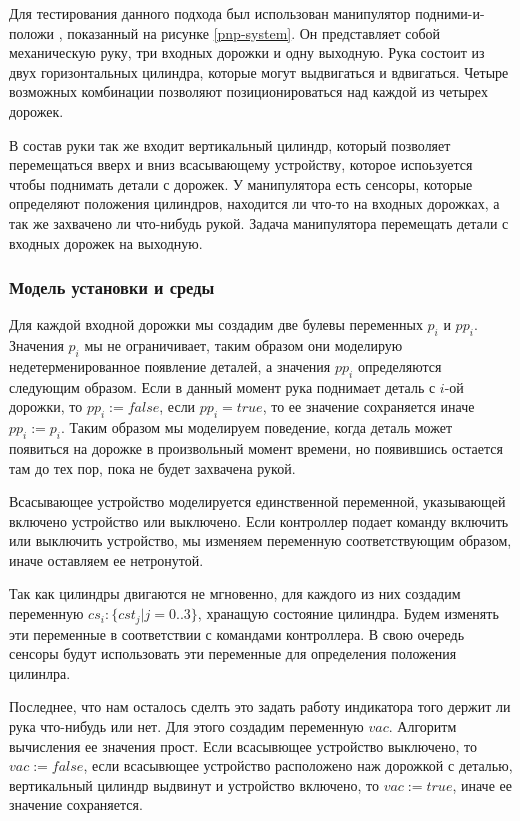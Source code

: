\documentclass[14pt]{extarticle}
\theoremstyle{plain}
\theoremstyle{definition}
\begin{document}
Для тестирования данного подхода был использован манипулятор подними-и-положи \cite{pnp},
показанный на рисунке \ref{pnp-system}.
Он представляет собой механическую руку, три входных дорожки и одну выходную.
Рука состоит из двух горизонтальных цилиндра, которые могут выдвигаться и
вдвигаться. Четыре возможных комбинации позволяют позиционироваться над
каждой из четырех дорожек. 

В состав руки так же входит вертикальный цилиндр, который позволяет
перемещаться вверх и вниз всасывающему устройству, которое испоьзуется чтобы
поднимать детали с дорожек. У манипулятора есть сенсоры, которые определяют
положения цилиндров, находится ли что-то на входных дорожках, а так же
захвачено ли что-нибудь рукой. Задача манипулятора перемещать детали с входных
дорожек на выходную.

\subsubsection{Модель установки и среды}

Для каждой входной дорожки мы создадим две булевы переменных $p_i$ и $pp_i$.
Значения $p_i$ мы не ограничивает, таким образом они моделирую
недетерменированное появление деталей, а значения $pp_i$ определяются
следующим образом. Если в данный момент рука поднимает деталь с $i$-ой
дорожки, то $pp_i := false$, если $pp_i = true$, то ее значение сохраняется
иначе $pp_i := p_i$. Таким образом мы моделируем поведение, когда деталь
может появиться на дорожке в произвольный момент времени, но появившись
остается там до тех пор, пока не будет захвачена рукой.

Всасывающее устройство моделируется единственной переменной, указывающей
включено устройство или выключено. Если контроллер подает команду включить
или выключить устройство, мы изменяем переменную соответствующим образом,
иначе оставляем ее нетронутой.

Так как цилиндры двигаются не мгновенно, для каждого из них создадим переменную
$cs_i : \{cst_j | j = 0 .. 3 \}$, хранащую состояние цилиндра. Будем изменять
эти переменные в соответствии с командами контроллера. В свою очередь сенсоры
будут использовать эти переменные для определения положения цилинлра.

Последнее, что нам осталось сделть это задать работу индикатора того держит
ли рука что-нибудь или нет. Для этого создадим переменную $vac$. Алгоритм
вычисления ее значения прост. Если всасывющее устройство выключено, то
$vac := false$, если всасывющее устройство расположено наж дорожкой с деталью,
вертикальный цилиндр выдвинут и устройство включено, то $vac := true$, иначе
ее значение сохраняется.
\end{document}
